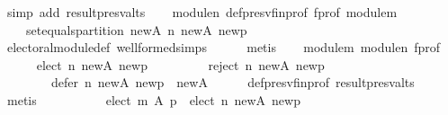 \begin{isabellebody}
\ {\isacharparenleft}{\kern0pt}simp\ add{\isacharcolon}{\kern0pt}\ result{\isacharunderscore}{\kern0pt}presv{\isacharunderscore}{\kern0pt}alts{\isacharparenright}{\kern0pt}\isanewline
\ \ \isamarkupfalse%
\ module{\isacharunderscore}{\kern0pt}n\ def{\isacharunderscore}{\kern0pt}presv{\isacharunderscore}{\kern0pt}fin{\isacharunderscore}{\kern0pt}prof\ f{\isacharunderscore}{\kern0pt}prof\ module{\isacharunderscore}{\kern0pt}m\ \isamarkupfalse%
\isanewline
\ \ \ \ {\isachardoublequoteopen}set{\isacharunderscore}{\kern0pt}equals{\isacharunderscore}{\kern0pt}partition\ {\isacharquery}{\kern0pt}new{\isacharunderscore}{\kern0pt}A\ {\isacharparenleft}{\kern0pt}n\ {\isacharquery}{\kern0pt}new{\isacharunderscore}{\kern0pt}A\ {\isacharquery}{\kern0pt}new{\isacharunderscore}{\kern0pt}p{\isacharparenright}{\kern0pt}{\isachardoublequoteclose}\isanewline
\ \ \ \ \isamarkupfalse%
\ electoral{\isacharunderscore}{\kern0pt}module{\isacharunderscore}{\kern0pt}def\ well{\isacharunderscore}{\kern0pt}formed{\isachardot}{\kern0pt}simps\isanewline
\ \ \ \ \isamarkupfalse%
\ metis\isanewline
\ \ \isamarkupfalse%
\ module{\isacharunderscore}{\kern0pt}m\ module{\isacharunderscore}{\kern0pt}n\ f{\isacharunderscore}{\kern0pt}prof\ \isamarkupfalse%
\ {}{\isacharcolon}{\kern0pt}\isanewline
\ \ \ \ {\isachardoublequoteopen}elect\ n\ {\isacharquery}{\kern0pt}new{\isacharunderscore}{\kern0pt}A\ {\isacharquery}{\kern0pt}new{\isacharunderscore}{\kern0pt}p\ {\isasymunion}\isanewline
\ \ \ \ \ \ \ \ reject\ n\ {\isacharquery}{\kern0pt}new{\isacharunderscore}{\kern0pt}A\ {\isacharquery}{\kern0pt}new{\isacharunderscore}{\kern0pt}p\ {\isasymunion}\isanewline
\ \ \ \ \ \ \ \ defer\ n\ {\isacharquery}{\kern0pt}new{\isacharunderscore}{\kern0pt}A\ {\isacharquery}{\kern0pt}new{\isacharunderscore}{\kern0pt}p\ {\isacharequal}{\kern0pt}\ {\isacharquery}{\kern0pt}new{\isacharunderscore}{\kern0pt}A{\isachardoublequoteclose}\isanewline
\ \ \ \ \isamarkupfalse%
\ def{\isacharunderscore}{\kern0pt}presv{\isacharunderscore}{\kern0pt}fin{\isacharunderscore}{\kern0pt}prof\ result{\isacharunderscore}{\kern0pt}presv{\isacharunderscore}{\kern0pt}alts\isanewline
\ \ \ \ \isamarkupfalse%
\ metis\isanewline
\ \ \isamarkupfalse%
\ {}\ {}\ \isamarkupfalse%
\isanewline
\ \ \ \ {\isachardoublequoteopen}{\isacharparenleft}{\kern0pt}elect\ m\ A\ p\ {\isasymunion}\ elect\ n\ {\isacharquery}{\kern0pt}new{\isacharunderscore}{\kern0pt}A\ {\isacharquery}{\kern0pt}new{\isacharunderscore}{\kern0pt}p{\isacharparenright}{\kern0pt}\ {\isasymunion}\isanewline

\end{isabellebody}
